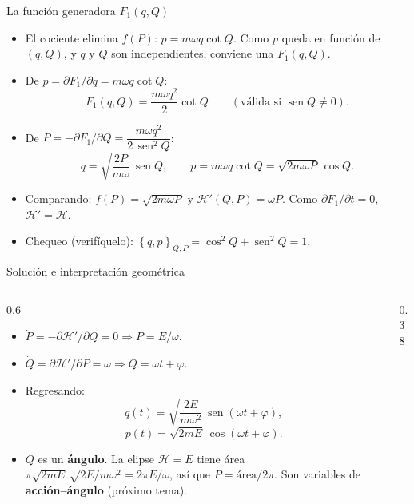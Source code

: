 \documentclass[spanish]{beamer}
\providecommand{\sen}{\operatorname{sen}}
\newcommand{\Ham}{\mathcal{H}}
\newcommand{\pb}[2]{\left\{#1,#2\right\}}   %
\begin{document}
\begin{frame}{La función generadora $F_1(q,Q)$}
\small
\begin{itemize}
  \item<1-> El cociente elimina $f(P)$: $p = m\omega q\cot Q$. Como $p$ queda en
        función de $(q,Q)$, y $q$ y $Q$ son independientes, conviene una $F_1(q,Q)$.
  \item<2-> De $p = \partial F_1/\partial q = m\omega q\cot Q$:
  \[
    F_1(q,Q) = \frac{m\omega q^2}{2}\cot Q
    \qquad(\text{válida si } \sen Q\neq 0).
  \]
  \item<3-> De $P = -\partial F_1/\partial Q = \dfrac{m\omega q^2}{2\,\sen^2 Q}$:
  \[
    q = \sqrt{\frac{2P}{m\omega}}\,\sen Q, \qquad
    p = m\omega q\cot Q = \sqrt{2m\omega P}\,\cos Q .
  \]
  \item<4-> Comparando: $f(P) = \sqrt{2m\omega P}$ y
        $\boxed{\Ham'(Q,P) = \omega P}$. Como $\partial F_1/\partial t = 0$,
        $\Ham' = \Ham$.
  \item<5-> Chequeo (verifíquelo): $\pb{q}{p}_{Q,P} = \cos^2Q + \sen^2Q = 1$.
\end{itemize}
\end{frame}

\begin{frame}{Solución e interpretación geométrica}
\begin{columns}
\begin{column}{0.6\textwidth}
\begin{itemize}
  \item<1-> $\dot P = -\partial\Ham'/\partial Q = 0 \Rightarrow P = E/\omega$.
  \item<2-> $\dot Q = \partial\Ham'/\partial P = \omega \Rightarrow Q = \omega t + \varphi$.
  \item<3-> Regresando:
  \[
    q(t) = \sqrt{\frac{2E}{m\omega^2}}\,\sen(\omega t + \varphi),
  \]
  \[
    p(t) = \sqrt{2mE}\,\cos(\omega t + \varphi).
  \]
  \item<4-> $Q$ es un \textbf{ángulo}. La elipse $\Ham = E$ tiene área
        $\pi\sqrt{2mE}\,\sqrt{2E/m\omega^2} = 2\pi E/\omega$, así que
        $P = \text{área}/2\pi$. Son variables de \textbf{acción--ángulo}
        (próximo tema).
\end{itemize}
\end{column}
\begin{column}{0.38\textwidth}
\end{column}
\end{columns}
\end{frame}
\end{document}
